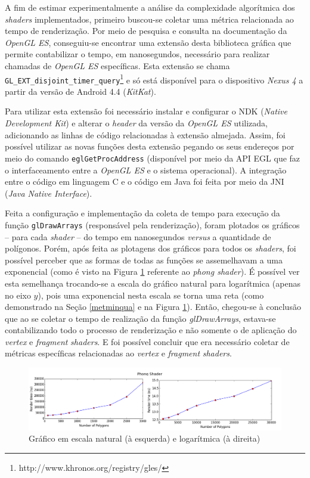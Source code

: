 	A fim de estimar experimentalmente a análise da complexidade algorítmica dos \textit{shaders} implementados, primeiro buscou-se coletar uma métrica relacionada ao tempo de renderização. Por meio de pesquisa e consulta na documentação da \textit{OpenGL ES}, conseguiu-se encontrar uma extensão desta biblioteca gráfica que permite contabilizar o tempo, em nanosegundos, necessário para realizar chamadas de \textit{OpenGL ES} específicas. Esta extensão se chama \texttt{GL\_EXT\_disjoint\_timer\_query}\footnote{http://www.khronos.org/registry/gles/} e só está disponível para o dispositivo \textit{Nexus 4} a partir da versão de Android 4.4 (\textit{KitKat}).

	Para utilizar esta extensão foi necessário instalar e configurar o NDK (\textit{Native Development Kit}) e alterar o \textit{header} da versão da \textit{OpenGL ES} utilizada, adicionando as linhas de código relacionadas à extensão almejada. Assim, foi possível utilizar as novas funções desta extensão pegando os seus endereços por meio do comando \texttt{eglGetProcAddress} (disponível por meio da API EGL que faz o interfaceamento entre a \textit{OpenGL ES} e o sistema operacional). A integração entre o código em linguagem C e o código em Java foi feita por meio da JNI (\textit{Java Native Interface}).

	Feita a configuração e implementação da coleta de tempo para execução da função \texttt{glDrawArrays} (responsável pela renderização), foram plotados os gráficos -- para cada \textit{shader} -- do tempo em nanosegundos \textit{versus} a quantidade de polígonos. Porém, após feita as plotagens dos gráficos para todos os \textit{shaders}, foi possível perceber que as formas de todas as funções se assemelhavam a uma exponencial (como é visto na Figura  \ref{ndk_exp} referente ao \textit{phong shader}). É possível ver esta semelhança trocando-se a escala do gráfico natural para logarítmica (apenas no eixo $y$), pois uma exponencial nesta escala se torna uma reta (como demonstrado na Seção \ref{metminqua} e na  Figura  \ref{ndk_exp}). Então, chegou-se à conclusão que ao se coletar o tempo de realização da função \textit{glDrawArrays}, estava-se contabilizando todo o processo de renderização e não somente o de aplicação do \textit{vertex} e  \textit{fragment}  \textit{shaders}. E foi possível concluir que era necessário coletar de métricas específicas relacionadas ao \textit{vertex} e \textit{fragment} \textit{shaders}. 

	\begin{figure}[ht]
	\centering
		\includegraphics[keepaspectratio=true,scale=0.42]{figuras/ndk_exp.png}
	\caption{Gráfico em escala natural (à esquerda) e logarítmica (à direita)}
	\label{ndk_exp}
	\end{figure}


